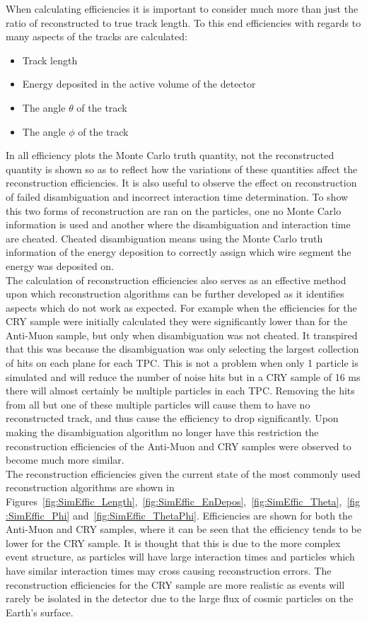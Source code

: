 When calculating efficiencies it is important to consider much more than just the ratio of reconstructed to true track length. To this end efficiencies with regards to many aspects of the tracks are calculated:
\begin{itemize}
\item Track length
\item Energy deposited in the active volume of the detector
\item The angle $\theta$ of the track
\item The angle $\phi$ of the track
\end{itemize}
In all efficiency plots the Monte Carlo truth quantity, not the reconstructed quantity is shown so as to reflect how the variations of these quantities affect the reconstruction efficiencies. It is also useful to observe the effect on reconstruction of failed disambiguation and incorrect interaction time determination. To show this two forms of reconstruction are ran on the particles, one no Monte Carlo information is used and another where the disambiguation and interaction time are cheated. Cheated disambiguation means using the Monte Carlo truth information of the energy deposition to correctly assign which wire segment the energy was deposited on. \\

The calculation of reconstruction efficiencies also serves as an effective method upon which reconstruction algorithms can be further developed as it identifies aspects which do not work as expected. For example when the efficiencies for the CRY sample were initially calculated they were significantly lower than for the Anti-Muon sample, but only when disambiguation was not cheated. It transpired that this was because the disambiguation was only selecting the largest collection of hits on each plane for each TPC. This is not a problem when only 1 particle is simulated and will reduce the number of noise hits but in a CRY sample of 16 ms there will almost certainly be multiple particles in each TPC. Removing the hits from all but one of these multiple particles will cause them to have no reconstructed track, and thus cause the efficiency to drop significantly. Upon making the disambiguation algorithm no longer have this restriction the reconstruction efficiencies of the Anti-Muon and CRY samples were observed to become much more similar. \\

The reconstruction efficiencies given the current state of the most commonly used reconstruction algorithms are shown in Figures~\ref{fig:SimEffic_Length},~\ref{fig:SimEffic_EnDepos},~\ref{fig:SimEffic_Theta},~\ref{fig:SimEffic_Phi} and~\ref{fig:SimEffic_ThetaPhi}. Efficiencies are shown for both the Anti-Muon and CRY samples, where it can be seen that the efficiency tends to be lower for the CRY sample. It is thought that this is due to the more complex event structure, as particles will have large interaction times and particles which have similar interaction times may cross causing reconstruction errors. The reconstruction efficiencies for the CRY sample are more realistic as events will rarely be isolated in the detector due to the large flux of cosmic particles on the Earth's surface. \\

